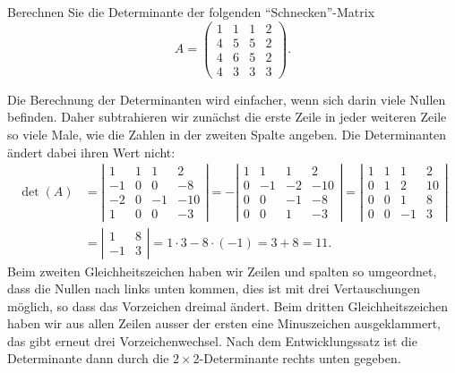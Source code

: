 Berechnen Sie die Determinante der folgenden ``Schnecken''-Matrix
\[
A=
\begin{pmatrix}
1&1&1&2\\
4&5&5&2\\
4&6&5&2\\
4&3&3&3
\end{pmatrix}.
\]


\begin{loesung}
Die Berechnung der Determinanten wird einfacher, wenn sich darin viele
Nullen befinden.
Daher subtrahieren wir zunächst die erste Zeile in jeder weiteren Zeile
so viele Male, wie die Zahlen in der zweiten Spalte angeben.
Die Determinanten ändert dabei ihren Wert nicht:
\begin{align*}
\det(A)
&=
\left|
\begin{matrix}
1&1&1&2\\
-1&0&0&-8\\
-2&0&-1&-10\\
1&0&0&-3
\end{matrix}\right|
=
-
\left|
\begin{matrix}
1& 1& 1&  2\\
0&-1&-2&-10\\
0& 0&-1& -8\\
0& 0& 1& -3
\end{matrix}\right|
=
\left|
\begin{matrix}
1& 1& 1&  2\\
0& 1& 2& 10\\
0& 0& 1&  8\\
0& 0&-1&  3
\end{matrix}\right|
\\
&=
\left|
\begin{matrix}
1&8\\-1&3
\end{matrix}\right|
=1\cdot 3-8\cdot(-1)=3+8=11.
\end{align*}
Beim zweiten Gleichheitszeichen haben wir Zeilen und spalten so umgeordnet,
dass die Nullen nach links unten kommen, dies ist mit drei Vertauschungen
möglich, so dass das Vorzeichen dreimal ändert.
Beim dritten Gleichheitszeichen haben wir aus allen Zeilen ausser der ersten
eine Minuszeichen ausgeklammert, das gibt erneut drei Vorzeichenwechsel.
Nach dem Entwicklungssatz ist die Determinante dann durch die
$2\times 2$-Determinante rechts unten gegeben.


\end{loesung}
